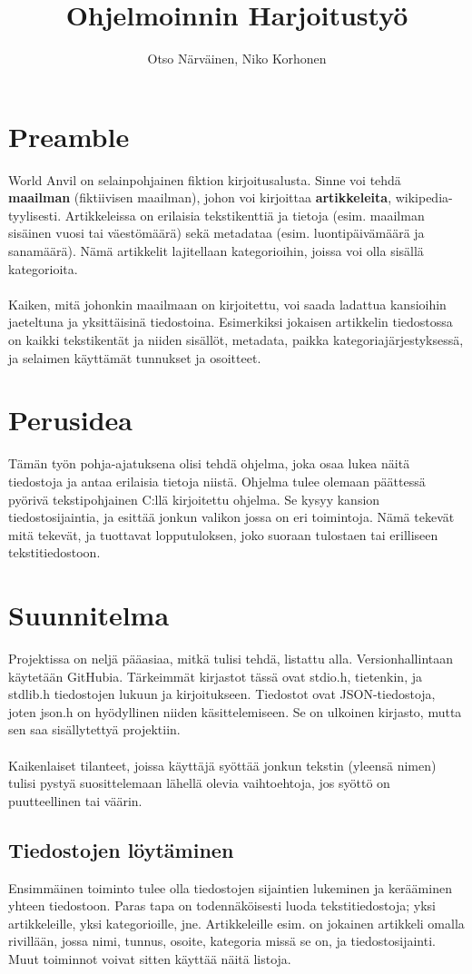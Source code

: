 \documentclass[finnish,11pt,a4paper]{article}
\title{Ohjelmoinnin Harjoitustyö}
\author{Otso Närväinen, Niko Korhonen}
\begin{document}
	\maketitle
	\tableofcontents
	\section{Preamble}
		World Anvil on selainpohjainen fiktion kirjoitusalusta. Sinne voi tehdä \textbf{maailman} (fiktiivisen maailman), johon voi kirjoittaa \textbf{artikkeleita}, wikipedia-tyylisesti. Artikkeleissa on erilaisia tekstikenttiä ja tietoja (esim. maailman sisäinen vuosi tai väestömäärä) sekä metadataa (esim. luontipäivämäärä ja sanamäärä). Nämä artikkelit lajitellaan kategorioihin, joissa voi olla sisällä kategorioita. \\\\
		Kaiken, mitä johonkin maailmaan on kirjoitettu, voi saada ladattua kansioihin jaeteltuna ja yksittäisinä tiedostoina. Esimerkiksi jokaisen artikkelin tiedostossa on kaikki tekstikentät ja niiden sisällöt, metadata, paikka kategoriajärjestyksessä, ja selaimen käyttämät tunnukset ja osoitteet. 
	\section{Perusidea}
		Tämän työn pohja-ajatuksena olisi tehdä ohjelma, joka osaa lukea näitä tiedostoja ja antaa erilaisia tietoja niistä. Ohjelma tulee olemaan päättessä pyörivä tekstipohjainen C:llä kirjoitettu ohjelma. Se kysyy kansion tiedostosijaintia, ja esittää jonkun valikon jossa on eri toimintoja. Nämä tekevät mitä tekevät, ja tuottavat lopputuloksen, joko suoraan tulostaen tai erilliseen tekstitiedostoon. 
	\section{Suunnitelma}
		Projektissa on neljä pääasiaa, mitkä tulisi tehdä, listattu alla. Versionhallintaan käytetään GitHubia. Tärkeimmät kirjastot tässä ovat stdio.h, tietenkin, ja stdlib.h tiedostojen lukuun ja kirjoitukseen. Tiedostot ovat JSON-tiedostoja, joten json.h on hyödyllinen niiden käsittelemiseen. Se on ulkoinen kirjasto, mutta sen saa sisällytettyä projektiin.\\\\
		Kaikenlaiset tilanteet, joissa käyttäjä syöttää jonkun tekstin (yleensä nimen) tulisi pystyä suosittelemaan lähellä olevia vaihtoehtoja, jos syöttö on puutteellinen tai väärin. 
	\subsection{Tiedostojen löytäminen}
		Ensimmäinen toiminto tulee olla tiedostojen sijaintien lukeminen ja kerääminen yhteen tiedostoon. Paras tapa on todennäköisesti luoda tekstitiedostoja; yksi artikkeleille, yksi kategorioille, jne. Artikkeleille esim. on jokainen artikkeli omalla rivillään, jossa nimi, tunnus, osoite, kategoria missä se on, ja tiedostosijainti. Muut toiminnot voivat sitten käyttää näitä listoja.
\end{document}
